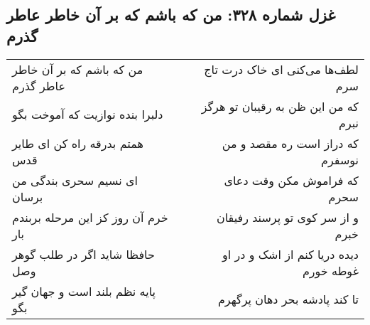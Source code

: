 \begin{center}
\section*{غزل شماره ۳۲۸: من که باشم که بر آن خاطر عاطر گذرم}
\label{sec:sh328}
\begin{longtable}{l p{0.5cm} r}
من که باشم که بر آن خاطر عاطر گذرم
&&
لطف‌ها می‌کنی ای خاک درت تاج سرم
\\
دلبرا بنده نوازیت که آموخت بگو
&&
که من این ظن به رقیبان تو هرگز نبرم
\\
همتم بدرقه راه کن ای طایر قدس
&&
که دراز است ره مقصد و من نوسفرم
\\
ای نسیم سحری بندگی من برسان
&&
که فراموش مکن وقت دعای سحرم
\\
خرم آن روز کز این مرحله بربندم بار
&&
و از سر کوی تو پرسند رفیقان خبرم
\\
حافظا شاید اگر در طلب گوهر وصل
&&
دیده دریا کنم از اشک و در او غوطه خورم
\\
پایه نظم بلند است و جهان گیر بگو
&&
تا کند پادشه بحر دهان پرگهرم
\\
\end{longtable}
\end{center}
